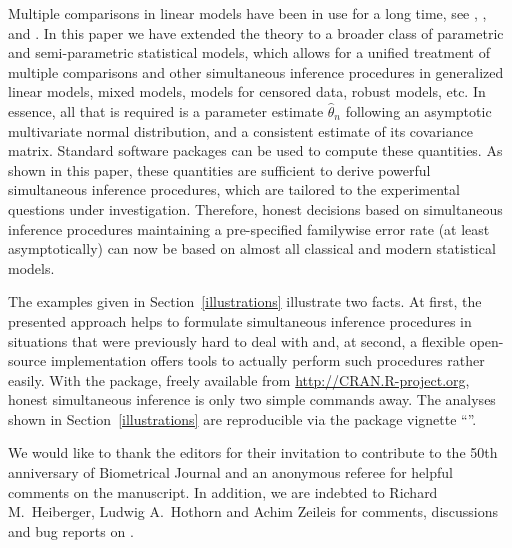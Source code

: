 \documentclass[bimj,fleqn]{w-art}
\begin{document}
Multiple comparisons in linear models have been in use for a long time, see 
\cite{HochbergTamhane1987}, \cite{Hsu1996}, and \cite{Bretzetal2008}. In
this paper we have extended the theory to a broader class of parametric and
semi-parametric statistical models, which allows for a unified treatment of
multiple comparisons and other simultaneous inference procedures in
generalized linear models, mixed models, models for censored data, 
robust models, etc.
In essence, all that is required is a parameter estimate $\hat{\theta}_n$
following an asymptotic multivariate normal distribution, and a consistent
estimate of its covariance matrix. Standard software packages
can be used to compute these quantities. As shown in this paper, these
quantities are sufficient to derive powerful simultaneous inference
procedures, which are tailored to the experimental questions under
investigation. Therefore, honest decisions based on simultaneous inference
procedures maintaining a pre-specified familywise error rate (at least
asymptotically) can now be
based on almost all classical and modern statistical models.

The examples given in Section~\ref{illustrations} illustrate two facts.
At first, the presented approach helps to formulate simultaneous inference
procedures in situations that were previously hard to deal with and, at
second, a flexible open-source implementation offers tools to actually
perform such procedures rather easily. With the  package,
freely available from \url{http://CRAN.R-project.org}, honest simultaneous
inference is only two simple \RR{} commands away. The analyses shown
in Section~\ref{illustrations} are reproducible via the 
package vignette ``''.

\begin{acknowledgement}
  We would like to thank the editors
  for their invitation to contribute to the 50th anniversary
  of Biometrical Journal and an anonymous referee
  for helpful comments on the manuscript.  
  In addition, we are indebted to Richard M.~Heiberger, 
  Ludwig A.~Hothorn and Achim Zeileis for comments, 
  discussions and bug reports on .
\end{acknowledgement}




\end{document}
